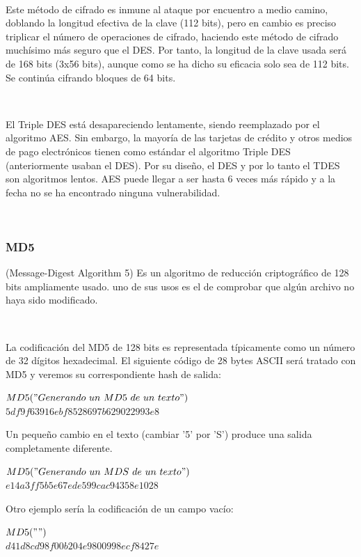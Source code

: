 \documentclass[11pt, conference]{IEEEtran}
\begin{document}
\

Este método de cifrado es inmune al ataque por encuentro a medio camino, doblando la longitud efectiva de la clave (112 bits), pero en cambio es preciso triplicar el número de operaciones de cifrado, haciendo este método de cifrado muchísimo más seguro que el DES. Por tanto, la longitud de la clave usada será de 168 bits (3x56 bits), aunque como se ha dicho su eficacia solo sea de 112 bits. Se continúa cifrando bloques de 64 bits.

\

El Triple DES está desapareciendo lentamente, siendo reemplazado por el algoritmo AES. Sin embargo, la mayoría de las tarjetas de crédito y otros medios de pago electrónicos tienen como estándar el algoritmo Triple DES (anteriormente usaban el DES). Por su diseño, el DES y por lo tanto el TDES son algoritmos lentos. AES puede llegar a ser hasta 6 veces más rápido y a la fecha no se ha encontrado ninguna vulnerabilidad.

\

\subsubsection{MD5}
(Message-Digest Algorithm 5) Es un algoritmo de reducción criptográfico de 128 bits ampliamente usado. uno de sus usos es el de comprobar que algún archivo no haya sido modificado.

\

La codificación del MD5 de 128 bits es representada típicamente como un número de 32 dígitos hexadecimal. El siguiente código de 28 bytes ASCII será tratado con MD5 y veremos su correspondiente hash de salida:

\begin{center}
	$MD5("Generando\ un\ MD5\ de\ un\ texto")$\\ $5df9f63916ebf8528697b629022993e8$
\end{center}
Un pequeño cambio en el texto (cambiar '5' por 'S') produce una salida completamente diferente.
\begin{center}
	$MD5("Generando\ un\ MDS\ de\ un\ texto")$\\ $e14a3ff5b5e67ede599cac94358e1028$
\end{center}
Otro ejemplo serí­a la codificación de un campo vací­o:
\begin{center}
	$MD5("")$\\ $d41d8cd98f00b204e9800998ecf8427e$
\end{center}
\end{document}
